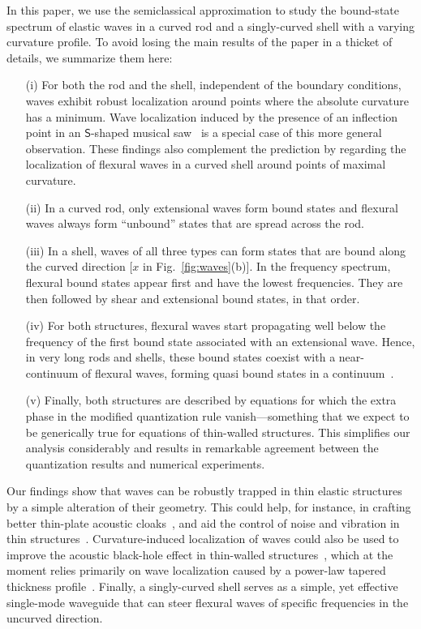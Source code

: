 In this paper, we use the semiclassical approximation to study the bound-state spectrum of elastic waves in a curved rod and a singly-curved shell with a varying curvature profile.
To avoid losing the main results of the paper in a thicket of details, we summarize them here:
%
\begin{enumerate}
  \setlength\itemsep{0em}
  \item[(i)] For both the rod and the shell, independent of the boundary conditions, waves exhibit robust localization around points where the absolute curvature has a minimum.
    Wave localization induced by the presence of an inflection point in an $\mathsf{S}$-shaped musical saw~\cite{scott1992,shankar2022} is a special case of this more general observation.
    These findings also complement the prediction by \citet{mohammed2021} regarding the localization of flexural waves in a curved shell around points of maximal curvature.
  \item[(ii)] In a curved rod, only extensional waves form bound states and flexural waves always form ``unbound'' states that are spread across the rod.
  \item[(iii)] In a shell, waves of all three types can form states that are bound along the curved direction
    [$x$ in Fig.~\ref{fig:waves}(b)].
    In the frequency spectrum, flexural bound states appear first and have the lowest frequencies.
    They are then followed by shear and extensional bound states, in that order.
  \item[(iv)] For both structures, flexural waves start propagating well below the frequency of the first bound state associated with an extensional wave.
    Hence, in very long rods and shells, these bound states coexist with a near-continuum of flexural waves, forming quasi bound states in a continuum~\cite{hsu2016}.
  \item[(v)]
    Finally, both structures are described by equations for which the extra phase in the modified quantization rule vanish---something that we expect to be generically true for equations of thin-walled structures.
    This simplifies our analysis considerably and results in remarkable agreement between the quantization results and numerical experiments.
\end{enumerate}

Our findings show that waves can be robustly trapped in thin elastic structures by a simple alteration of their geometry.
This could help, for instance, in crafting better thin-plate acoustic cloaks~\cite{farhat2009}, and aid the control of noise and vibration in thin structures~\cite{mace1987,hansen2012}.
Curvature-induced localization of waves could also be used to improve the acoustic black-hole effect in thin-walled structures~\cite{lee2017,pelat2020}, which at the moment relies primarily on wave localization caused by a power-law tapered thickness profile~\cite{krylov2020}.
Finally, a singly-curved shell serves as a simple, yet effective single-mode waveguide that can steer flexural waves of specific frequencies in the uncurved direction.

